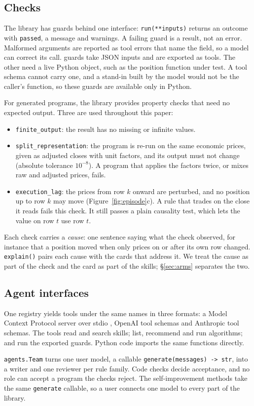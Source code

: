 \subsection{Checks}
\label{sec:checks}

The library has \NGuards{} guards behind one interface: \texttt{run(**inputs)} returns an
outcome with \texttt{passed}, a message and warnings. A failing guard is a result, not an
error. Malformed arguments are reported as tool errors that name the field, so a model can
correct its call. \NGuardsExported{} guards take JSON inputs and are exported as tools. The
other \NGuardsPythonOnly{} need a live Python object, such as the position function under
test. A tool schema cannot carry one, and a stand-in built by the model would not be the
caller's function, so these guards are available only in Python.

For generated programs, the library provides property checks that need no expected output.
Three are used throughout this paper:
\begin{itemize}
\item \texttt{finite\_output}: the result has no missing or infinite values.
\item \texttt{split\_representation}: the program is re-run on the same economic prices,
given as adjusted closes with unit factors, and its output must not change (absolute
tolerance $10^{-8}$). A program that applies the factors twice, or mixes raw and adjusted
prices, fails.
\item \texttt{execution\_lag}: the prices from row $k$ onward are perturbed, and no position
up to row $k$ may move (Figure~\ref{fig:episode}c). A rule that trades on the close it reads
fails this check. It still passes a plain causality test, which lets the value on row $t$ use
row $t$.
\end{itemize}
Each check carries a \emph{cause}: one sentence saying what the check observed, for
instance that a position moved when only prices on or after its own row changed.
\texttt{explain()} pairs each cause with the cards that address it. We treat the cause as
part of the check and the card as part of the skills; \S\ref{sec:arms} separates the two.

\subsection{Agent interfaces}
\label{sec:interfaces}

One registry yields \NTools{} tools under the same names in three formats: a Model Context
Protocol server over stdio \citep{mcp2026spec}, OpenAI tool schemas and Anthropic tool
schemas. The tools read and search skills; list, recommend and run algorithms; and run the
exported guards. Python code imports the same functions directly.

\texttt{agents.Team} turns one user model, a callable \texttt{generate(messages) -> str}, into
a writer and one reviewer per rule family. Code checks decide acceptance, and no role can
accept a program the checks reject. The self-improvement methods take the same
\texttt{generate} callable, so a user connects one model to every part of the library.
